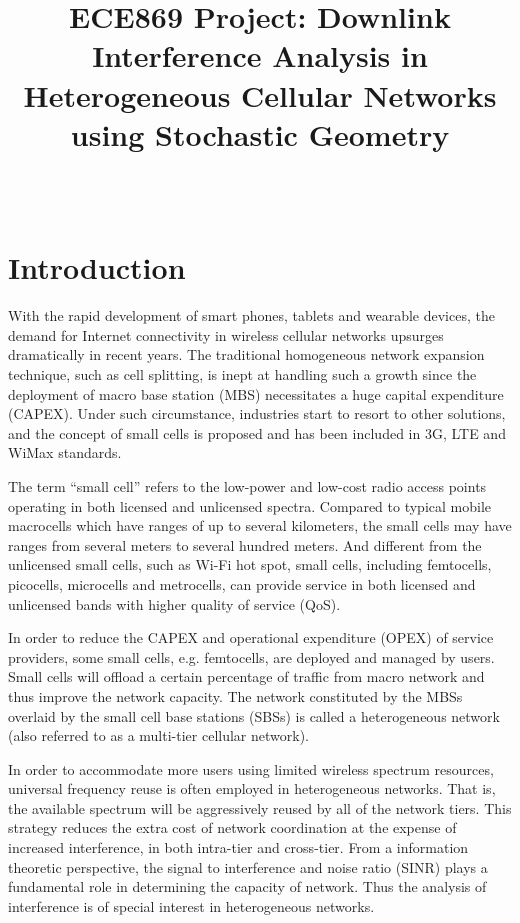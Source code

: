 \documentclass[a4paper,twocolumn]{IEEEtran}
\begin{document}
\title{ECE869 Project: Downlink Interference Analysis in Heterogeneous Cellular Networks using Stochastic Geometry}
\author{\\
	\vspace{6pt}
	}
\maketitle
\section{Introduction}
With the rapid development of smart phones, tablets and wearable devices, the demand for Internet connectivity in wireless cellular networks upsurges dramatically in recent years. The traditional homogeneous network expansion technique, such as cell splitting, is inept at handling such a growth since the deployment of macro base station (MBS) necessitates a huge capital expenditure (CAPEX). Under such circumstance, industries start to resort to other solutions, and the concept of small cells is proposed and has been included in 3G, LTE and WiMax standards\cite{Lin2011}.

The term ``small cell'' refers to the low-power and low-cost radio access points operating in both licensed and unlicensed spectra. Compared to typical mobile macrocells which have ranges of up to several kilometers, the small cells may have ranges from several meters to several hundred meters. And different from the unlicensed small cells, such as Wi-Fi hot spot, small cells, including femtocells, picocells, microcells and metrocells, can provide service in both licensed and unlicensed bands with higher quality of service (QoS).

In order to reduce the CAPEX and operational expenditure (OPEX) of service providers, some small cells, e.g. femtocells, are deployed and managed by users. Small cells will offload a certain percentage of traffic from macro network and thus improve the network capacity. The network constituted by the MBSs overlaid by the small cell base stations (SBSs) is called a heterogeneous network (also referred to as a multi-tier cellular network).

In order to accommodate more users using limited wireless spectrum resources, universal frequency reuse is often employed in heterogeneous networks\cite{Lin2011, Andrews2012JSAC}. That is, the available spectrum will be aggressively reused by all of the network tiers. This strategy reduces the extra cost of network coordination at the expense of increased interference, in both intra-tier and cross-tier. From a information theoretic perspective, the signal to interference and noise ratio (SINR) plays a fundamental role in determining the capacity of network. Thus the analysis of interference is of special interest in heterogeneous networks.
\end{document}
